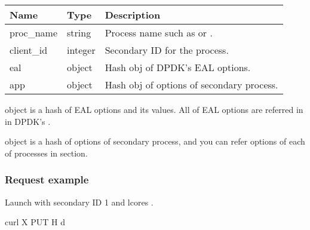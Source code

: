 \documentclass[a4paper,11pt,openany,oneside,english]{sphinxmanual}
\begin{document}
\begin{savenotes}\sphinxattablestart
\centering
{}
\sphinxthecaptionisattop
{}\label{\detokenize{api_ref/spp_primary:id26}}\label{\detokenize{api_ref/spp_primary:table-spp-ctl-spp-primary-launch-body}}
\sphinxaftertopcaption
\begin{tabulary}{\linewidth}[t]{|T|T|T|}
\hline
\sphinxstyletheadfamily 
Name
&\sphinxstyletheadfamily 
Type
&\sphinxstyletheadfamily 
Description
\\
\hline
proc\_name
&
string
&
Process name such as  or .
\\
\hline
client\_id
&
integer
&
Secondary ID for the process.
\\
\hline
eal
&
object
&
Hash obj of DPDK’s EAL options.
\\
\hline
app
&
object
&
Hash obj of options of secondary process.
\\
\hline
\end{tabulary}
\par
\sphinxattableend\end{savenotes}

 object is a hash of EAL options and its values. All of EAL options
are referred in
in DPDK’s
.

 object is a hash of options of secondary process, and you can refer
options of each of processes in
section.


\subsubsection{Request example}
\label{\detokenize{api_ref/spp_primary:id18}}
Launch  with secondary ID 1 and lcores .

\begin{sphinxVerbatim}[commandchars=\\\{\},formatcom=\footnotesize]
 curl \PYGZhy{}X PUT \PYGZhy{}H  
  \PYGZhy{}d 
\end{sphinxVerbatim}
\end{document}
